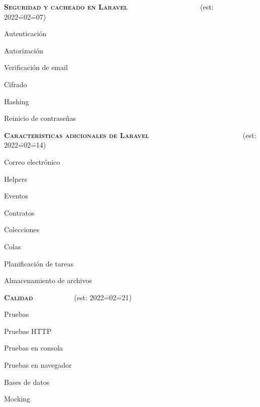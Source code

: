 \begin{longenum}
\begin{longenum}
    \end{longenum}
    \item \textbf{\textsc{Seguridad y cacheado en Laravel}} \ \ \ \ \ \ \ \ \ \ \ \ \ \ \ \ \ \ \ \ (est: 2022\==02\==07)
    \begin{longenum}
        \item Autenticación
        \item Autorización
        \item Verificación de email
        \item Cifrado
        \item Hashing
        \item Reinicio de contraseñas
    \end{longenum}
    \item \textbf{\textsc{Características adicionales de Laravel}} \ \ \ \ \ \ \ \ \ \ \ \ \ \ \ \ \ \ \ \ \ \ \ \ \ \ (est: 2022\==02\==14)
    \begin{longenum}
        \item Correo electrónico
        \item Helpers
        \item Eventos
        \item Contratos
        \item Colecciones
        \item Colas
        \item Planificación de tareas
        \item Almacenamiento de archivos
    \end{longenum}
    \item \textbf{\textsc{Calidad}} \ \ \ \ \ \ \ \ \ \ \ (est: 2022\==02\==21)
    \begin{longenum}
        \item Pruebas
        \begin{longenum}
            \item Pruebas HTTP
            \item Pruebas en consola
            \item Pruebas en navegador
            \item Bases de datos
            \item Mocking

\end{longenum}
\end{longenum}
\end{longenum}
